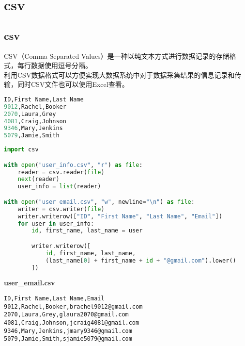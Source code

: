 \newpage

\section{csv}

\subsection{csv}

CSV（Comma-Separated Values）是一种以纯文本方式进行数据记录的存储格式，每行数据使用逗号分隔。\\

利用CSV数据格式可以方便实现大数据系统中对于数据采集结果的信息记录和传输，同时CSV文件也可以使用Excel查看。\\


\begin{lstlisting}[language=Python, title=user\_info.csv]
ID,First Name,Last Name
9012,Rachel,Booker
2070,Laura,Grey
4081,Craig,Johnson
9346,Mary,Jenkins
5079,Jamie,Smith
\end{lstlisting}

\begin{lstlisting}[language=Python]
import csv

with open("user_info.csv", "r") as file:
    reader = csv.reader(file)
    next(reader)
    user_info = list(reader)

with open("user_email.csv", "w", newline="\n") as file:
    writer = csv.writer(file)
    writer.writerow(["ID", "First Name", "Last Name", "Email"])
    for user in user_info:
        id, first_name, last_name = user

        writer.writerow([
            id, first_name, last_name,
            (last_name[0] + first_name + id + "@gmail.com").lower()
        ])
\end{lstlisting}

\begin{tcolorbox}
    \textbf{user\_email.csv}
    \begin{verbatim}
ID,First Name,Last Name,Email
9012,Rachel,Booker,brachel9012@gmail.com
2070,Laura,Grey,glaura2070@gmail.com
4081,Craig,Johnson,jcraig4081@gmail.com
9346,Mary,Jenkins,jmary9346@gmail.com
5079,Jamie,Smith,sjamie5079@gmail.com
\end{verbatim}
\end{tcolorbox}

\newpage